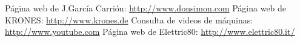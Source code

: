 \documentclass[11pt,a4paper,spanish,twoside]{report}
\begin{document}
\begin{thebibliography}{99}
 Página web de J.García Carrión: \url{http://www.donsimon.com}
 Página web de KRONES: \url{http://www.krones.de}
 Consulta de videos de máquinas:
  \url{http://www.youtube.com}
 Página web de Elettric80:  \url{http://www.elettric80.it/}
\end{thebibliography}
% 
%
\end{document}
